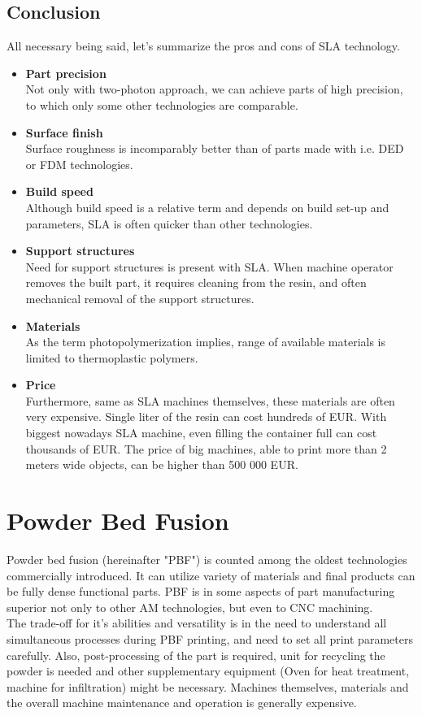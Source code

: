\documentclass[a4paper, twoside, 11pt]{report}
\newcommand\pro{\item[$+$]}
\newcommand\con{\item[$-$]}
\begin{document}
\section{Conclusion}
All necessary being said, let's summarize the pros and cons of SLA technology.
%
\begin{itemize}
\pro \textbf{Part precision}\\
Not only with two-photon approach, we can achieve parts of high precision, to which only some other technologies are comparable.
\pro \textbf{Surface finish}\\
Surface roughness is incomparably better than of parts made with i.e. DED or FDM technologies.
\pro \textbf{Build speed}\\
Although build speed is a relative term and depends on build set-up and parameters, SLA is often quicker than other technologies.
\\[10pt]
\con \textbf{Support structures}\\
Need for support structures is present with SLA. When machine operator removes the built part, it requires cleaning from the resin, and often mechanical removal of the support structures.
\con \textbf{Materials}\\
As the term photopolymerization implies, range of available materials is limited to thermoplastic polymers.
\con \textbf{Price}\\
Furthermore, same as SLA machines themselves, these materials are often very expensive. Single liter of the resin can cost hundreds of EUR. With biggest nowadays SLA machine, even filling the container full can cost thousands of EUR. The price of big machines, able to print more than 2 meters wide objects, can be higher than 500 000 EUR.
\end{itemize}




\chapter{Powder Bed Fusion}
Powder bed fusion (hereinafter "PBF") is counted among the oldest technologies commercially introduced. It can utilize variety of materials and final products can be fully dense functional parts. PBF is in some aspects of part manufacturing superior not only to other AM technologies, but even to CNC machining.\\
	The trade-off for it's abilities and versatility is in the need to understand all simultaneous processes during PBF printing, and need to set all print parameters carefully. Also, post-processing of the part is required, unit for recycling the powder is needed and other supplementary equipment (Oven for heat treatment, machine for infiltration) might be necessary. Machines themselves, materials and the overall machine maintenance and operation is generally expensive.
\end{document}
